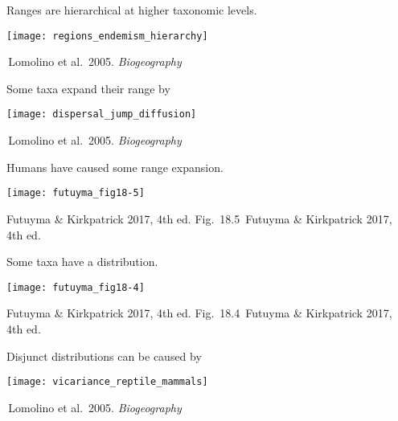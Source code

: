 \documentclass[t]{beamer}
\newcommand{\futuyma}[1]{%
	\ifthenelse{\isempty{#1}}%
	{Futuyma \& Kirkpatrick 2017, 4th ed.}%
	{Fig.~#1~Futuyma \& Kirkpatrick 2017, 4th ed.}%
}
\newcommand{\backskip}{\vspace{-0.5\baselineskip}}
\begin{document}
\begin{frame}{Ranges are hierarchical at higher taxonomic levels.}

\backskip

\centering 

\texttt{[image: regions\_endemism\_hierarchy]}
	

\tinyfill \textcopyright\,Lomolino et al.~2005. \emph{Biogeography}


\end{frame}


%

\begin{frame}{Some taxa expand their range by }

\backskip

\centering

\texttt{[image: dispersal\_jump\_diffusion]}
	

\tinyfill \textcopyright\,Lomolino et al.~2005. \emph{Biogeography}

\end{frame}


\begin{frame}{Humans have caused some range expansion.}

\backskip

\centering

\texttt{[image: futuyma\_fig18-5]}
	

\tinyfill \futuyma{18.5}

\end{frame}


\begin{frame}{Some taxa have a  distribution.}

\backskip

\centering

\texttt{[image: futuyma\_fig18-4]}
	

\tinyfill \futuyma{18.4}

\end{frame}

\begin{frame}{Disjunct distributions can be caused by }

\backskip

\centering

\texttt{[image: vicariance\_reptile\_mammals]}
	

\tinyfill \textcopyright\,Lomolino et al.~2005. \emph{Biogeography}

\end{frame}
\end{document}
